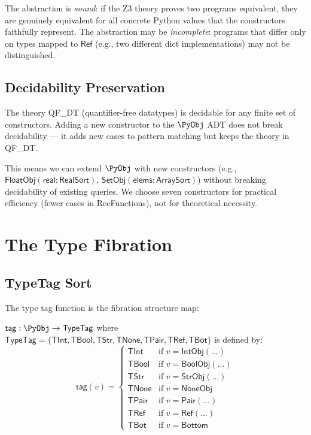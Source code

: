 The abstraction is \emph{sound}: if the Z3 theory proves two
programs equivalent, they are genuinely equivalent for all concrete
Python values that the constructors faithfully represent.  The
abstraction may be \emph{incomplete}: programs that differ only on
types mapped to $\mathsf{Ref}$ (e.g., two different dict
implementations) may not be distinguished.

\subsection{Decidability Preservation}

\begin{proposition}
\label{prop:adt-decidable}
The theory QF\_DT (quantifier-free datatypes) is decidable for any
finite set of constructors.  Adding a new constructor to the $\PyObj$
ADT does not break decidability --- it adds new cases to pattern
matching but keeps the theory in QF\_DT.
\end{proposition}

This means we can extend $\PyObj$ with new constructors (e.g.,
$\mathsf{FloatObj}(\mathsf{real} : \mathsf{RealSort})$,
$\mathsf{SetObj}(\mathsf{elems} : \mathsf{ArraySort})$) without
breaking decidability of existing queries.  We choose seven
constructors for practical efficiency (fewer cases in RecFunctions),
not for theoretical necessity.

\section{The Type Fibration}

\subsection{TypeTag Sort}

The type tag function is the fibration structure map:

\begin{definition}
$\mathsf{tag} : \PyObj \to \mathsf{TypeTag}$ where
$\mathsf{TypeTag} = \{\mathsf{TInt}, \mathsf{TBool}, \mathsf{TStr},
\mathsf{TNone}, \mathsf{TPair}, \mathsf{TRef}, \mathsf{TBot}\}$
is defined by:
\[
  \mathsf{tag}(v) = \begin{cases}
    \mathsf{TInt} & \text{if } v = \mathsf{IntObj}(\ldots) \\
    \mathsf{TBool} & \text{if } v = \mathsf{BoolObj}(\ldots) \\
    \mathsf{TStr} & \text{if } v = \mathsf{StrObj}(\ldots) \\
    \mathsf{TNone} & \text{if } v = \mathsf{NoneObj} \\
    \mathsf{TPair} & \text{if } v = \mathsf{Pair}(\ldots) \\
    \mathsf{TRef} & \text{if } v = \mathsf{Ref}(\ldots) \\
    \mathsf{TBot} & \text{if } v = \mathsf{Bottom}
  \end{cases}
\]
\end{definition}

